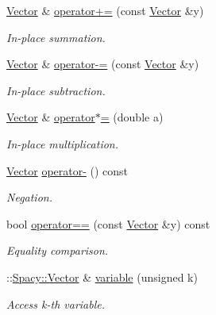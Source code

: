 \begin{DoxyCompactItemize}
\hyperlink{classSpacy_1_1ProductSpace_1_1Vector}{Vector} \& \hyperlink{classSpacy_1_1ProductSpace_1_1Vector_a436c5daafcd9567da95280b3e123133f_a436c5daafcd9567da95280b3e123133f}{operator+=} (const \hyperlink{classSpacy_1_1ProductSpace_1_1Vector}{Vector} \&y)
\begin{DoxyCompactList}\small\item\em In-\/place summation. \end{DoxyCompactList}\item 
\hyperlink{classSpacy_1_1ProductSpace_1_1Vector}{Vector} \& \hyperlink{classSpacy_1_1ProductSpace_1_1Vector_ad4d4ce74f603a6770dc01dd5b9f274bd_ad4d4ce74f603a6770dc01dd5b9f274bd}{operator-\/=} (const \hyperlink{classSpacy_1_1ProductSpace_1_1Vector}{Vector} \&y)
\begin{DoxyCompactList}\small\item\em In-\/place subtraction. \end{DoxyCompactList}\item 
\hyperlink{classSpacy_1_1ProductSpace_1_1Vector}{Vector} \& \hyperlink{classSpacy_1_1ProductSpace_1_1Vector_ae73175d28239d96ff5dc93f53b95f6b2_ae73175d28239d96ff5dc93f53b95f6b2}{operator$\ast$=} (double a)
\begin{DoxyCompactList}\small\item\em In-\/place multiplication. \end{DoxyCompactList}\item 
\hyperlink{classSpacy_1_1ProductSpace_1_1Vector}{Vector} \hyperlink{classSpacy_1_1ProductSpace_1_1Vector_a2b6983855c878025246fbe3aaae5c4d5_a2b6983855c878025246fbe3aaae5c4d5}{operator-\/} () const 
\begin{DoxyCompactList}\small\item\em Negation. \end{DoxyCompactList}\item 
bool \hyperlink{classSpacy_1_1ProductSpace_1_1Vector_ab24adf80ee585c1c5bb01348c375389b_ab24adf80ee585c1c5bb01348c375389b}{operator==} (const \hyperlink{classSpacy_1_1ProductSpace_1_1Vector}{Vector} \&y) const 
\begin{DoxyCompactList}\small\item\em Equality comparison. \end{DoxyCompactList}\item 
\+::\hyperlink{classSpacy_1_1Vector}{Spacy\+::\+Vector} \& \hyperlink{classSpacy_1_1ProductSpace_1_1Vector_aa607c43a2d1cd59da7b4007f7f4347a6_aa607c43a2d1cd59da7b4007f7f4347a6}{variable} (unsigned k)
\begin{DoxyCompactList}\small\item\em Access k-\/th variable. \end{DoxyCompactList}\item 

\end{DoxyCompactItemize}
